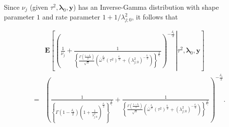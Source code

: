 \documentclass[noinfoline,11pt]{imsart}
\numberwithin{equation}{section}
\theoremstyle{plain}
\newcommand{\bl}{\boldsymbol{\lambda}}
\newcommand{\E}{\boldsymbol{E}}
\begin{document}
\noindent
Since $\nu_j$ (given $\tau^2,\mathbf{\lambda}_0,\mathbf{y}$) has an 
Inverse-Gamma distribution with shape parameter $1$ and rate parameter $1+1/\lambda_{j;0}^2$, it follows that 

\begin{eqnarray}
   & & \E\left[\left.\left(\frac{1}{\nu_j}+\frac{1}{\left\{\frac{\Gamma\left(\frac{1-\delta_1}{2}\right)}{\sqrt{\pi}}\left(\bar{\omega}^{\frac{\delta_1}{2}}\left(\tau^2\right)^{\frac{\delta_1}{2}}+\left(\lambda_{j;0}^2\right)^{-\frac{\delta_1}{2}}\right)\right\}^{\frac{2}{\delta_1}}}\right)^{-\frac{\delta_1}{2}}\right|\tau^2,\mathbf{\bl}_0,\mathbf{y}\right] 
   \nonumber\\
   &=& \left(\frac{1}{\left\{\Gamma\left(1-\frac{\delta_1}{2}\right)\left(1+\frac{1}{\lambda_{j;0}^2}\right)^{\frac{\delta_1}{2}}\right\}^{\frac{2}{\delta_1}}}+\frac{1}{\left\{\frac{\Gamma\left(\frac{1-\delta_1}{2}\right)}{\sqrt{\pi}}\left(\bar{\omega}^{\frac{\delta_1}{2}}\left(\tau^2\right)^{\frac{\delta_1}{2}}+\left(\lambda_{j;0}^2\right)^{-\frac{\delta_1}{2}}\right)\right\}^{\frac{2}{\delta_1}}}\right)^{-\frac{\delta_1}{2}}. 
   \label{moment}
   \end{eqnarray}
\end{document}
